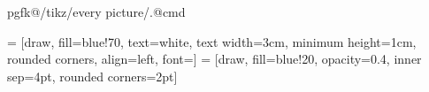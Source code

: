 %
\newif\iftr     %
\newif\ifall    %
\newif\ifconf   %
\newif\ifsq     %
\newif\ifnonb   %
\newif\iftodos

\newif\ifsqCAP
\newif\ifsqVS
\newif\ifsqEN
\newif\ifsqTIT

\sqtrue
\sqCAPtrue
\sqENtrue
\sqVStrue
\sqTITtrue


\newcommand{\tr}[1]{\iftr #1 \fi}
\newcommand{\all}[1]{\ifall #1 \fi}
\newcommand{\cnf}[1]{\ifconf #1 \fi}



%
\usepackage{etex}
\usepackage{balance}
\usepackage{epstopdf}
\usepackage{placeins}



%
\usepackage{cite}



%
\usepackage{graphicx}
\usepackage{float}
\usepackage{dblfloatfix}
\usepackage{multirow}
\usepackage{rotating}
\usepackage[switch]{lineno} %
\usepackage{makecell}
\usepackage{tabulary}
\usepackage{parcolumns}
\usepackage{tikz}
\usetikzlibrary{tikzmark}

%
\usepackage{xpatch}
\expandafter\xpatchcmd
\csname pgfk@/tikz/every picture/.@cmd\endcsname
{\thepage}{}{}{}

%
 = [draw, fill=blue!70, text=white, text width=3cm, minimum height=1cm, rounded corners, align=left, font=\scriptsize]
 = [draw, fill=blue!20, opacity=0.4, inner sep=4pt, rounded corners=2pt]

\usetikzlibrary{shapes}
\usetikzlibrary{plotmarks}
\usetikzlibrary{calc, fit}

\let\labelindent\relax
\usepackage{enumitem}



%
\usepackage{amsthm}
\usepackage{amsmath,amssymb,amsfonts}
\usepackage{mathtools,mathrsfs}

